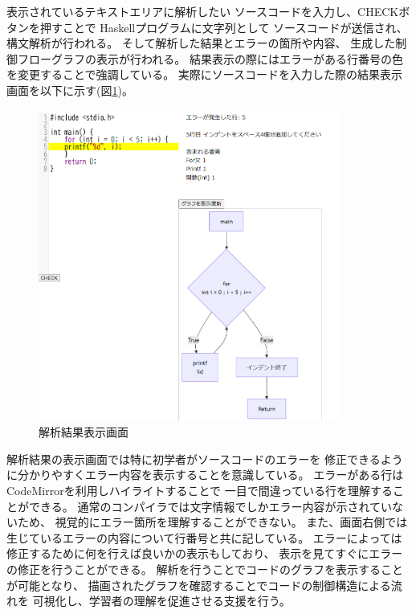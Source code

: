 \documentclass{cssspaper}
\begin{document}
        表示されているテキストエリアに解析したい
        ソースコードを入力し、CHECKボタンを押すことで
        Haskellプログラムに文字列として
        ソースコードが送信され、構文解析が行われる。
        そして解析した結果とエラーの箇所や内容、
        生成した制御フローグラフの表示が行われる。
        結果表示の際にはエラーがある行番号の色を変更することで強調している。
        実際にソースコードを入力した際の結果表示画面を以下に示す(図\ref{fig:systemuse2})。

        \begin{figure}[h]
            \centering
            \includegraphics[width=10cm]{systemuse2.png}
            \caption{解析結果表示画面}
            \label{fig:systemuse2}
        \end{figure}

        解析結果の表示画面では特に初学者がソースコードのエラーを
        修正できるように分かりやすくエラー内容を表示することを意識している。
        エラーがある行はCodeMirrorを利用しハイライトすることで
        一目で間違っている行を理解することができる。
        通常のコンパイラでは文字情報でしかエラー内容が示されていないため、
        視覚的にエラー箇所を理解することができない。
        また、画面右側では生じているエラーの内容について行番号と共に記している。
        エラーによっては修正するために何を行えば良いかの表示もしており、
        表示を見てすぐにエラーの修正を行うことができる。
        解析を行うことでコードのグラフを表示することが可能となり、
        描画されたグラフを確認することでコードの制御構造による流れを
        可視化し、学習者の理解を促進させる支援を行う。
\end{document}
